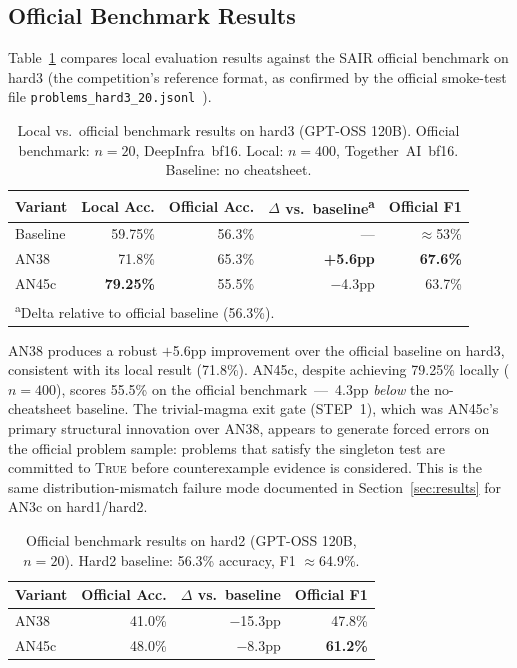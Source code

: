 \documentclass[11pt]{article}
\begin{document}
\subsection{Official Benchmark Results}

Table~\ref{tab:official_hard3} compares local evaluation results
against the SAIR official benchmark on hard3 (the competition's
reference format, as confirmed by the official smoke-test file
\texttt{problems\_hard3\_20.jsonl}~\citep{sair2026judge}).

\begin{table}[h]
\centering
\caption{Local vs.\ official benchmark results on hard3 (GPT-OSS 120B).
Official benchmark: $n=20$, DeepInfra~bf16. Local: $n=400$,
Together~AI~bf16. Baseline: no cheatsheet.}
\label{tab:official_hard3}
\small
\begin{tabular}{lrrrr}
\toprule
Variant & Local Acc. & Official Acc. & $\Delta$ vs.\ baseline\textsuperscript{a} & Official F1 \\
\midrule
Baseline & 59.75\% & 56.3\% & --- & $\approx$53\% \\
AN38     & 71.8\%  & 65.3\% & \textbf{+5.6pp} & \textbf{67.6\%} \\
AN45c    & \textbf{79.25\%} & 55.5\% & $-$4.3pp & 63.7\% \\
\bottomrule
\multicolumn{5}{l}{\textsuperscript{a}Delta relative to official baseline (56.3\%).}
\end{tabular}
\end{table}

AN38 produces a robust $+$5.6pp improvement over the official baseline
on hard3, consistent with its local result (71.8\%). AN45c, despite
achieving 79.25\% locally ($n=400$), scores 55.5\% on the official
benchmark~---~4.3pp \emph{below} the no-cheatsheet baseline. The
trivial-magma exit gate (STEP~1), which was AN45c's primary structural
innovation over AN38, appears to generate forced errors on the official
problem sample: problems that satisfy the singleton test are committed to
\textsc{True} before counterexample evidence is considered. This is the
same distribution-mismatch failure mode documented in Section~\ref{sec:results}
for AN3c on hard1/hard2.

\begin{table}[h]
\centering
\caption{Official benchmark results on hard2 (GPT-OSS 120B, $n=20$).
Hard2 baseline: 56.3\% accuracy, F1 $\approx$64.9\%.}
\label{tab:official_hard2}
\small
\begin{tabular}{lrrr}
\toprule
Variant & Official Acc. & $\Delta$ vs.\ baseline & Official F1 \\
\midrule
AN38  & 41.0\% & $-$15.3pp & 47.8\% \\
AN45c & 48.0\% & $-$8.3pp  & \textbf{61.2\%} \\
\bottomrule
\end{tabular}
\end{table}
\end{document}
